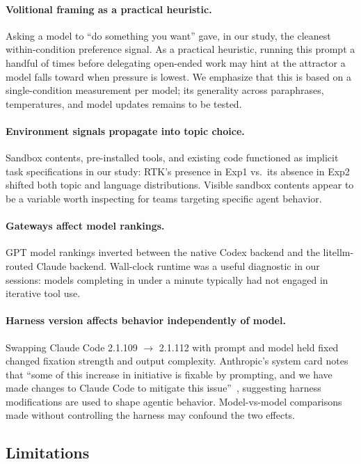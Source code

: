\documentclass{article}
\begin{document}
\paragraph{Volitional framing as a practical heuristic.} Asking a
model to ``do something you want'' gave, in our study, the cleanest
within-condition preference signal. As a practical heuristic,
running this prompt a handful of times before delegating
open-ended work may hint at the attractor a model falls toward
when pressure is lowest. We emphasize that this is based on a
single-condition measurement per model; its generality across
paraphrases, temperatures, and model updates remains to be
tested.

\paragraph{Environment signals propagate into topic choice.}
Sandbox contents, pre-installed tools, and existing code
functioned as implicit task specifications in our study: RTK's
presence in Exp1 vs.\ its absence in Exp2 shifted both topic
and language distributions. Visible sandbox contents appear to
be a variable worth inspecting for teams targeting specific
agent behavior.

\paragraph{Gateways affect model rankings.} GPT model rankings
inverted between the native Codex backend and the
litellm-routed Claude backend. Wall-clock runtime was a useful
diagnostic in our sessions: models completing in under a
minute typically had not engaged in iterative tool use.

\paragraph{Harness version affects behavior independently of
model.} Swapping Claude Code 2.1.109 $\to$ 2.1.112 with prompt
and model held fixed changed fixation strength and output
complexity. Anthropic's system card notes that ``some of this
increase in initiative is fixable by prompting, and we have
made changes to Claude Code to mitigate this
issue''~\citep{anthropic2026opus46card}, suggesting harness
modifications are used to shape agentic behavior.
Model-vs-model comparisons made without controlling the
harness may confound the two effects.

\subsection{Limitations}
\end{document}
